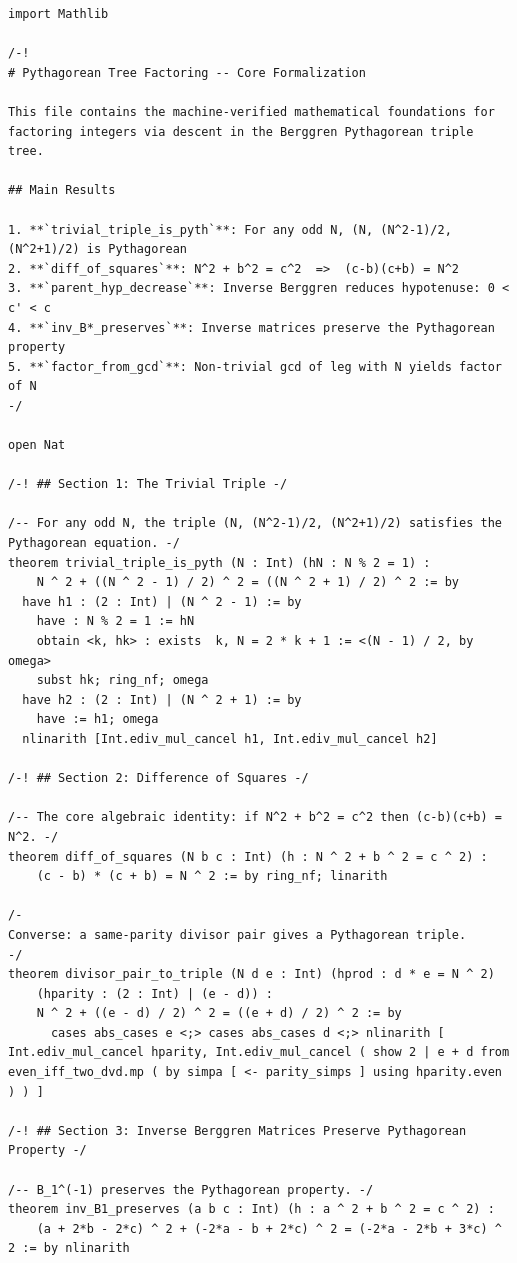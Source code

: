 \documentclass[11pt,openright,twoside]{book}
\theoremstyle{definition}
\begin{document}
\begin{lstlisting}[style=lean]
import Mathlib

/-!
# Pythagorean Tree Factoring -- Core Formalization

This file contains the machine-verified mathematical foundations for
factoring integers via descent in the Berggren Pythagorean triple tree.

## Main Results

1. **`trivial_triple_is_pyth`**: For any odd N, (N, (N^2-1)/2, (N^2+1)/2) is Pythagorean
2. **`diff_of_squares`**: N^2 + b^2 = c^2  =>  (c-b)(c+b) = N^2
3. **`parent_hyp_decrease`**: Inverse Berggren reduces hypotenuse: 0 < c' < c
4. **`inv_B*_preserves`**: Inverse matrices preserve the Pythagorean property
5. **`factor_from_gcd`**: Non-trivial gcd of leg with N yields factor of N
-/

open Nat

/-! ## Section 1: The Trivial Triple -/

/-- For any odd N, the triple (N, (N^2-1)/2, (N^2+1)/2) satisfies the Pythagorean equation. -/
theorem trivial_triple_is_pyth (N : Int) (hN : N % 2 = 1) :
    N ^ 2 + ((N ^ 2 - 1) / 2) ^ 2 = ((N ^ 2 + 1) / 2) ^ 2 := by
  have h1 : (2 : Int) | (N ^ 2 - 1) := by
    have : N % 2 = 1 := hN
    obtain <k, hk> : exists  k, N = 2 * k + 1 := <(N - 1) / 2, by omega>
    subst hk; ring_nf; omega
  have h2 : (2 : Int) | (N ^ 2 + 1) := by
    have := h1; omega
  nlinarith [Int.ediv_mul_cancel h1, Int.ediv_mul_cancel h2]

/-! ## Section 2: Difference of Squares -/

/-- The core algebraic identity: if N^2 + b^2 = c^2 then (c-b)(c+b) = N^2. -/
theorem diff_of_squares (N b c : Int) (h : N ^ 2 + b ^ 2 = c ^ 2) :
    (c - b) * (c + b) = N ^ 2 := by ring_nf; linarith

/-
Converse: a same-parity divisor pair gives a Pythagorean triple.
-/
theorem divisor_pair_to_triple (N d e : Int) (hprod : d * e = N ^ 2)
    (hparity : (2 : Int) | (e - d)) :
    N ^ 2 + ((e - d) / 2) ^ 2 = ((e + d) / 2) ^ 2 := by
      cases abs_cases e <;> cases abs_cases d <;> nlinarith [ Int.ediv_mul_cancel hparity, Int.ediv_mul_cancel ( show 2 | e + d from even_iff_two_dvd.mp ( by simpa [ <- parity_simps ] using hparity.even ) ) ]

/-! ## Section 3: Inverse Berggren Matrices Preserve Pythagorean Property -/

/-- B_1^(-1) preserves the Pythagorean property. -/
theorem inv_B1_preserves (a b c : Int) (h : a ^ 2 + b ^ 2 = c ^ 2) :
    (a + 2*b - 2*c) ^ 2 + (-2*a - b + 2*c) ^ 2 = (-2*a - 2*b + 3*c) ^ 2 := by nlinarith


\end{lstlisting}
\end{document}
